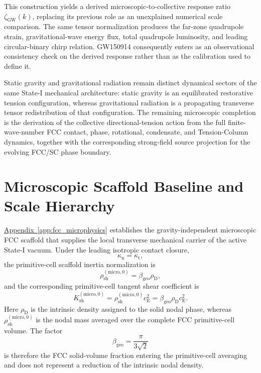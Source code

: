 This construction yields a derived microscopic-to-collective response ratio $\zeta_{\mathrm{GW}}(k)$, replacing its previous role as an unexplained numerical scale comparison. The same tensor normalization produces the far-zone quadrupole strain, gravitational-wave energy flux, total quadrupole luminosity, and leading circular-binary chirp relation. GW150914 consequently enters as an observational consistency check on the derived response rather than as the calibration used to define it.

Static gravity and gravitational radiation remain distinct dynamical sectors of the same State-I mechanical architecture: static gravity is an equilibrated restorative tension configuration, whereas gravitational radiation is a propagating transverse tensor redistribution of that configuration. The remaining microscopic completion is the derivation of the collective directional-tension action from the full finite-wave-number FCC contact, phase, rotational, condensate, and Tension-Column dynamics, together with the corresponding strong-field source projection for the evolving FCC/SC phase boundary.

\section{Microscopic Scaffold Baseline and Scale Hierarchy}
\label{sec:n1_microscopic_scaffold_baseline}

\hyperref[app:fcc_microphysics]{Appendix~\ref*{app:fcc_microphysics}} establishes the gravity-independent microscopic FCC scaffold that supplies the local transverse mechanical carrier of the active State-I vacuum. Under the leading isotropic contact closure,
\begin{equation}
    \kappa_{\mathrm{n}} = \kappa_{\mathrm{t}},
\end{equation}
the primitive-cell scaffold inertia normalization is
\begin{equation}
    \rho_{\mathrm{sh}}^{(\mathrm{micro},0)} = \beta_{\mathrm{geo}}\rho_{\mathrm{D}},
\end{equation}
and the corresponding primitive-cell tangent shear coefficient is
\begin{equation}
    K_{\mathrm{sh}}^{(\mathrm{micro},0)} = \rho_{\mathrm{sh}}^{(\mathrm{micro},0)}c_{\mathrm{E}}^{2} = \beta_{\mathrm{geo}}\rho_{\mathrm{D}}c_{\mathrm{E}}^{2}.
\end{equation}
Here $\rho_{\mathrm{D}}$ is the intrinsic density assigned to the solid nodal phase, whereas $\rho_{\mathrm{sh}}^{(\mathrm{micro},0)}$ is the nodal mass averaged over the complete FCC primitive-cell volume. The factor
\begin{equation}
    \beta_{\mathrm{geo}} = \frac{\pi}{3\sqrt{2}}
\end{equation}
is therefore the FCC solid-volume fraction entering the primitive-cell averaging and does not represent a reduction of the intrinsic nodal density.

